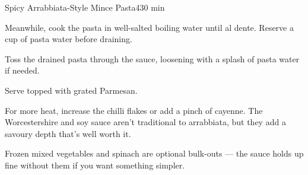 \begin{recipebox}{Spicy Arrabbiata-Style Mince Pasta}{4}{30 min}
\begin{method}
    \item Meanwhile, cook the pasta in well-salted boiling water until al dente. Reserve a cup of pasta water before draining.
    \item Toss the drained pasta through the sauce, loosening with a splash of pasta water if needed.
    \item Serve topped with grated Parmesan.
  \end{method}
  \begin{notes}
    For more heat, increase the chilli flakes or add a pinch of cayenne. The Worcestershire and soy sauce aren't traditional to arrabbiata, but they add a savoury depth that's well worth it.

    Frozen mixed vegetables and spinach are optional bulk-outs --- the sauce holds up fine without them if you want something simpler.
  \end{notes}
\end{recipebox}
